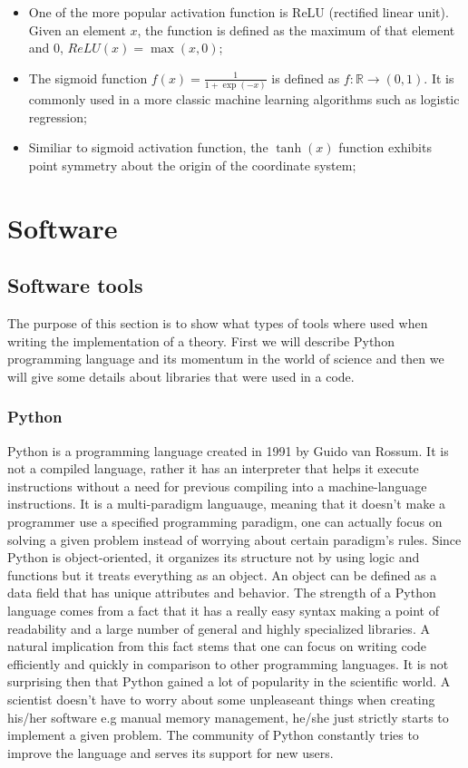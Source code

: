 \documentclass[a4paper,oneside,openright,11pt]{book}
\begin{document}
\begin{itemize}
    \item One of the more popular activation function is ReLU (rectified linear unit). Given an element $x$, the function is defined as the maximum of that element and $0$, $ReLU(x) = \max(x, 0)$;
    \item The sigmoid function $f(x) = \frac{1}{1 + \exp(-x)}$ is defined as $f: \mathbb{R} \rightarrow (0, 1)$. It is commonly used in a more classic machine learning algorithms such as logistic regression;
    \item Similiar to sigmoid activation function, the $\tanh(x)$ function exhibits point symmetry about the origin of the coordinate system;
\end{itemize}



\chapter{Software}

\section{Software tools}

The purpose of this section is to show what types of tools where used when writing the implementation of a theory. First we will describe Python programming language and its momentum in the world of science and then we will give some details about libraries that were used in a code.

\subsection{Python }

Python \cite{Python} is a programming language created in 1991 by Guido van Rossum. It is not a compiled language, rather it has an interpreter that helps it execute instructions without a need for previous compiling into a machine-language instructions. It is a multi-paradigm languauge, meaning that it doesn't make a programmer use a specified programming paradigm, one can actually focus on solving a given problem instead of worrying about certain paradigm's rules. Since Python is object-oriented, it organizes its structure not by using logic and functions but it treats everything as an object. An object can be defined as a data field that has unique attributes and behavior. The strength of a Python language comes from a fact that it has a really easy syntax making a point of readability and a large number of general and highly specialized libraries. A natural implication from this fact stems that one can focus on writing code efficiently and quickly in comparison to other programming languages. It is not surprising then that Python gained a lot of popularity in the scientific world. A scientist doesn't have to worry about some unpleaseant things when creating his/her software e.g manual memory management, he/she just strictly starts to implement a given problem. The community of Python constantly tries to improve the language and serves its support for new users.
\end{document}
